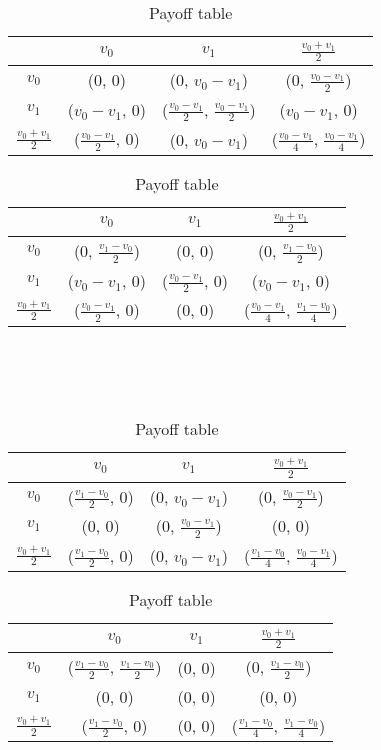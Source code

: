 \documentclass[]{article}
\begin{document}
\begin{table}[h]
	\begin{minipage}{0.4\linewidth}
		\begin{tabular}{c|ccc}
			\backslashbox{$v_0$}{$v_0$} & $v_0$ & $v_1$ & $\frac{v_0 + v_1}{2}$ \\\hline
			$v_0$ & (0, 0) & (0, $v_0 - v_1$) & (0, $\frac{v_0 - v_1}{2}$) \\
			$v_1$ & ($v_0 - v_1$, 0) & ($\frac{v_0 - v_1}{2}$, $\frac{v_0 - v_1}{2}$) & ($v_0 - v_1$, 0) \\
			$\frac{v_0 + v_1}{2}$ & ($\frac{v_0 - v_1}{2}$, 0) & (0, $v_0 - v_1$) & ($\frac{v_0 - v_1}{4}$, $\frac{v_0 - v_1}{4}$)
		\end{tabular}
	\end{minipage}\hfill
	\begin{minipage}{0.4\linewidth}
		\begin{tabular}{c|ccc}
			\backslashbox{$v_0$}{$v_1$} & $v_0$ & $v_1$ & $\frac{v_0 + v_1}{2}$ \\\hline
			$v_0$ & (0, $\frac{v_1 - v_0}{2}$) & (0, 0) & (0, $\frac{v_1 - v_0}{2}$) \\
			$v_1$ & ($v_0 - v_1$, 0) & ($\frac{v_0 - v_1}{2}$, 0) & ($v_0 - v_1$, 0) \\
			$\frac{v_0 + v_1}{2}$ & ($\frac{v_0 - v_1}{2}$, 0) & (0, 0) & ($\frac{v_0 - v_1}{4}$, $\frac{v_1 - v_0}{4}$)
		\end{tabular}
	\end{minipage}\\
	\\
	\\
	\begin{minipage}{0.4\linewidth}
		\begin{tabular}{c|ccc}
			\backslashbox{$v_1$}{$v_0$} & $v_0$ & $v_1$ & $\frac{v_0 + v_1}{2}$ \\\hline
			$v_0$ & ($\frac{v_1 - v_0}{2}$, 0) & (0, $v_0 - v_1$) & (0, $\frac{v_0 - v_1}{2}$) \\
			$v_1$ & (0, 0) & (0, $\frac{v_0 - v_1}{2}$) & (0, 0) \\
			$\frac{v_0 + v_1}{2}$ & ($\frac{v_1 - v_0}{2}$, 0) & (0, $v_0 - v_1$) & ($\frac{v_1 - v_0}{4}$, $\frac{v_0 - v_1}{4}$)
		\end{tabular}
	\end{minipage}\hfill
	\begin{minipage}{0.4\linewidth}
		\begin{tabular}{c|ccc}
			\backslashbox{$v_1$}{$v_1$} & $v_0$ & $v_1$ & $\frac{v_0 + v_1}{2}$ \\\hline
			$v_0$ & ($\frac{v_1 - v_0}{2}$, $\frac{v_1 - v_0}{2}$) & (0, 0) & (0, $\frac{v_1 - v_0}{2}$) \\
			$v_1$ & (0, 0) & (0, 0) & (0, 0) \\
			$\frac{v_0 + v_1}{2}$ & ($\frac{v_1 - v_0}{2}$, 0) & (0, 0) & ($\frac{v_1 - v_0}{4}$, $\frac{v_1 - v_0}{4}$)
		\end{tabular}
	\end{minipage}
	\caption{Payoff table}
	\label{tab:ex5payoff}
\end{table}
\end{document}
